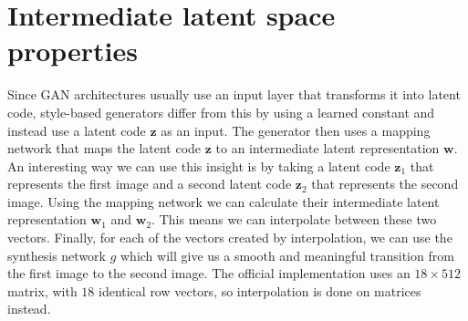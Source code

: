\documentclass[conference]{IEEEtran}
\begin{document}
\section{Intermediate latent space properties}

Since GAN architectures usually use an input layer that transforms it into latent code, style-based generators differ from this by using a learned constant and instead use a latent code $\mathbf{z}$ as an input. The generator then uses a mapping network that maps the latent code $\mathbf{z}$ to an intermediate latent representation $\mathbf{w}$. An interesting way we can use this insight is by taking a latent code $\mathbf{z}_1$ that represents the first image and a second latent code $\mathbf{z}_2$ that represents the second image. Using the mapping network we can calculate their intermediate latent representation $\mathbf{w}_1$ and $\mathbf{w}_2$. This means we can interpolate between these two vectors. Finally, for each of the vectors created by interpolation, we can use the synthesis network $g$ which will give us a smooth and meaningful transition from the first image to the second image. The official implementation uses an $18 \times 512$ matrix, with $18$ identical row vectors, so interpolation is done on matrices instead.
\end{document}
